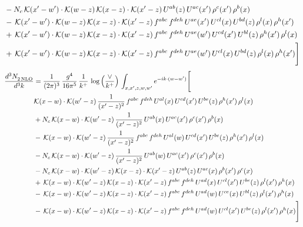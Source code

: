 \documentclass[9pt]{article}
\numberwithin{equation}{section}
\begin{document}
\begin{align}
&-N_{c}\,\mathcal{K}(x'-w')\cdot\mathcal{K}(w-z)\,\mathcal{K}(x-z)\cdot\mathcal{K}(x'-z)\,U^{ab}(z)\,U^{ac}(x')\,\rho^{c}(x')\,\rho^{b}(x)\notag\\
&-\,\mathcal{K}(x'-w')\cdot\mathcal{K}(w-z)\,\mathcal{K}(x-z)\cdot\mathcal{K}(x'-z)\,f^{abc}\,f^{deh}\,U^{ae}(x')\,U^{cl}(x)\,U^{bd}(z)\,\rho^{l}(x)\,\rho^{h}(x')\notag\\
&+\,\mathcal{K}(x'-w')\cdot\mathcal{K}(w-z)\,\mathcal{K}(x-z)\cdot\mathcal{K}(x'-z)\,f^{abc}\,f^{deh}\,U^{ae}(w')\,U^{cd}(x')\,U^{bl}(z)\,\rho^{h}(x')\,\rho^{l}(x)\notag\\
&+\,\mathcal{K}(x'-w')\cdot\mathcal{K}(w-z)\,\mathcal{K}(x-z)\cdot\mathcal{K}(x'-z)\,f^{abc}\,f^{deh}\,U^{ae}(w')\,U^{cl}(x)\,U^{bd}(z)\,\rho^{l}(x)\,\rho^{h}(x')\Bigg]
\end{align}
\begin{align}
\frac{d^{3}N_{2\,\rm NLO}^{\rm}}{d^{3}k}  & = \frac{1}{(2\pi)^{3}}\,\frac{g^{4}}{16\pi^{5}}\,\frac{1}{k^{+}}\,\log{\left(\frac{\vee}{k^{+}}\right)}\, \int_{x,x',z,w,w'}e^{-ik\cdot (w-w')}\Bigg[\notag\\ & \mathcal{K}(x-w)\cdot\mathcal{K}(w'-z)\,\frac{1}{(x'-z)^{2}}\,f^{abc}\,f^{deh}\,U^{al}(x)\,U^{cd}(x')\,U^{be}(z)\,\rho^{h}(x')\,\rho^{l}(x)\notag\\
&+N_{c}\,\mathcal{K}(x-w)\cdot\mathcal{K}(w'-z)\,\frac{1}{(x'-z)^{2}}\,U^{ab}(x)\,U^{ac}(x')\,\rho^{c}(x')\,\rho^{b}(x)\notag\\
&-\,\mathcal{K}(x-w)\cdot\mathcal{K}(w'-z)\,\frac{1}{(x'-z)^{2}}\,f^{abc}\,f^{deh}\,U^{al}(w)\,U^{cd}(x')\,U^{be}(z)\,\rho^{h}(x')\,\rho^{l}(x)\notag\\
&-N_{c}\,\mathcal{K}(x-w)\cdot\mathcal{K}(w'-z)\,\frac{1}{(x'-z)^{2}}\,U^{ab}(w)\,U^{ac}(x')\,\rho^{c}(x')\,\rho^{b}(x)\notag\\
&-N_{c}\,\mathcal{K}(x-w)\cdot\mathcal{K}(w'-z)\,\mathcal{K}(x-z)\cdot\mathcal{K}(x'-z)\,U^{ab}(z)\,U^{ac}(x)\,\rho^{b}(x')\,\rho^{c}(x)\notag\\
&+\,\mathcal{K}(x-w)\cdot\mathcal{K}(w'-z)\,\mathcal{K}(x-z)\cdot\mathcal{K}(x'-z)\,f^{abc}\,f^{deh}\,U^{ad}(x)\,U^{cl}(x')\,U^{be}(z)\,\rho^{l}(x')\,\rho^{h}(x)\notag\\
&-\,\mathcal{K}(x-w)\cdot\mathcal{K}(w'-z)\,\mathcal{K}(x-z)\cdot\mathcal{K}(x'-z)\,f^{abc}\,f^{deh}\,U^{ad}(w)\,U^{ce}(x)\,U^{bl}(z)\,\rho^{l}(x')\,\rho^{h}(x)\notag\\
&-\,\mathcal{K}(x-w)\cdot\mathcal{K}(w'-z)\,\mathcal{K}(x-z)\cdot\mathcal{K}(x'-z)\,f^{abc}\,f^{deh}\,U^{ad}(w)\,U^{cl}(x')\,U^{be}(z)\,\rho^{l}(x')\,\rho^{h}(x)\Bigg]
\end{align}
\end{document}
